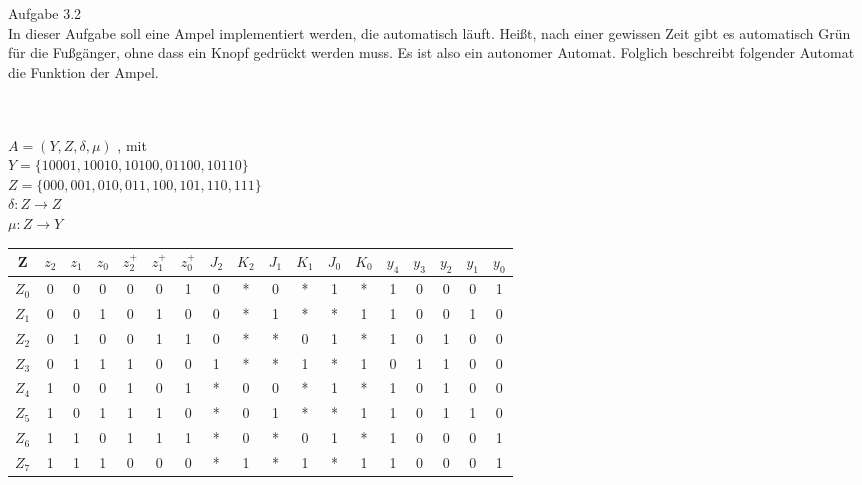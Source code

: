 \documentclass[11pt,a4paper]{article}
\begin{document}
Aufgabe 3.2\\
In dieser Aufgabe soll eine Ampel implementiert werden, die automatisch läuft. Heißt, nach einer gewissen Zeit gibt es automatisch Grün für die Fußgänger, ohne dass ein Knopf gedrückt werden muss. Es ist also ein autonomer Automat. Folglich beschreibt folgender Automat die Funktion der Ampel. \\
\\ \\
$A= (Y,Z,\delta,\mu)$ , mit\\
$Y= \lbrace 10001,10010,10100,01100,10110 \rbrace$ \\
$Z=\lbrace 000,001,010,011,100,101,110,111 \rbrace$ \\
$\delta : Z \rightarrow Z$\\
$\mu : Z \rightarrow Y$\\
\begin{tabular}{ c | c | c | c | | c | c | c | | c | c | c | c | c | c | | c | c | c | c | c}
Z&$z_2$&$z_1$&$z_0$&$z^+_2$&$z^+_1$&$z^+_0$&$J_2$&$K_2$&$J_1$&$K_1$&$J_0$&$K_0$&$y_4$&$y_3$&$y_2$&$y_1$&$y_0$ \\ \hline
$Z_0$&0&0&0&0&0&1&0&*&0&*&1&*&1&0&0&0&1\\
$Z_1$&0&0&1&0&1&0&0&*&1&*&*&1&1&0&0&1&0\\
$Z_2$&0&1&0&0&1&1&0&*&*&0&1&*&1&0&1&0&0\\
$Z_3$&0&1&1&1&0&0&1&*&*&1&*&1&0&1&1&0&0\\
$Z_4$&1&0&0&1&0&1&*&0&0&*&1&*&1&0&1&0&0\\
$Z_5$&1&0&1&1&1&0&*&0&1&*&*&1&1&0&1&1&0\\
$Z_6$&1&1&0&1&1&1&*&0&*&0&1&*&1&0&0&0&1\\
$Z_7$&1&1&1&0&0&0&*&1&*&1&*&1&1&0&0&0&1\\ \hline
\end{tabular}\\ \\ \\ \\ \\ \\ \\
\end{document}
